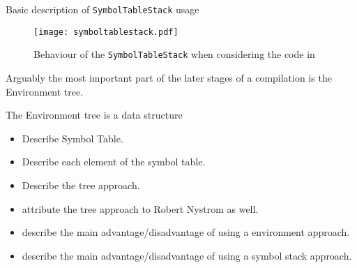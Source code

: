 \begin{algorithm}[H]
\caption{Basic description of \texttt{SymbolTableStack} usage}
\end{algorithm}

\begin{figure}[H]
\centering
\texttt{[image: symboltablestack.pdf]}
\caption{Behaviour of the \texttt{SymbolTableStack} when
considering the code in }
\end{figure}


Arguably the most important part of the later stages of
a compilation is the Environment tree.

The Environment tree is a data structure

\begin{itemize}
    \item Describe Symbol Table.
    \item Describe each element of the symbol table.
    \item Describe the tree approach.
    \item attribute the tree approach to Robert Nystrom as well.
    \item describe the main advantage/disadvantage of using a environment
        approach.
    \item describe the main advantage/disadvantage of using a symbol stack
        approach.
\end{itemize}
